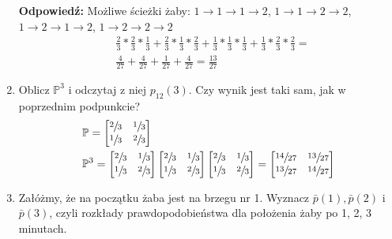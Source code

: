 \documentclass[a4paper,12pt]{article}
\theoremstyle{definition}%
\theoremstyle{definition}
\theoremstyle{problem}
\begin{document}
\begin{enumerate}[label=\alph*)]
\textbf{Odpowiedź:} Możliwe ścieżki żaby:
$1\rightarrow 1\rightarrow 1\rightarrow 2$,
$1\rightarrow 1\rightarrow 2\rightarrow 2$,
$1\rightarrow 2\rightarrow 1\rightarrow 2$,
$1\rightarrow 2\rightarrow 2\rightarrow 2$
\begin{align*}
&\frac{2}{3}*\frac{2}{3}*\frac{1}{3}+\frac{2}{3}*\frac{1}{3}*\frac{2}{3}+\frac{1}{3}*\frac{1}{3}*\frac{1}{3}+\frac{1}{3}*\frac{2}{3}*\frac{2}{3}=\\
&\frac{4}{27}+\frac{4}{27}+\frac{1}{27}+\frac{4}{27} = \frac{13}{27}
\end{align*}
\item Oblicz $\mathbb{P}^3$ i odczytaj z niej $p_{12}(3)$. Czy wynik jest taki sam, jak w poprzednim podpunkcie?
\begin{align*}
&\mathbb{P}=\begin{bmatrix}
\sfrac{2}{3}&\sfrac{1}{3}\\
\sfrac{1}{3}&\sfrac{2}{3}
\end{bmatrix}\\
&\mathbb{P}^3=\begin{bmatrix}
\sfrac{2}{3}&\sfrac{1}{3}\\
\sfrac{1}{3}&\sfrac{2}{3}
\end{bmatrix}\begin{bmatrix}
\sfrac{2}{3}&\sfrac{1}{3}\\
\sfrac{1}{3}&\sfrac{2}{3}
\end{bmatrix}\begin{bmatrix}
\sfrac{2}{3}&\sfrac{1}{3}\\
\sfrac{1}{3}&\sfrac{2}{3}
\end{bmatrix}=\begin{bmatrix}
\sfrac{14}{27}&\sfrac{13}{27}\\
\sfrac{13}{27}&\sfrac{14}{27}
\end{bmatrix}
\end{align*}
\item Załóżmy, że na początku żaba jest na brzegu nr 1. Wyznacz $\bar{p}(1), \bar{p}(2)$ i $\bar{p}(3)$, czyli rozkłady prawdopodobieństwa dla położenia żaby po 1, 2, 3 minutach.


\end{enumerate}
\end{document}
